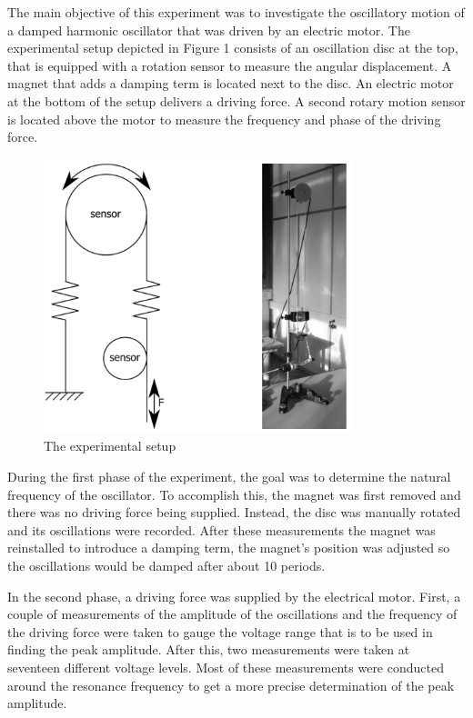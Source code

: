 The main objective of this experiment was to investigate the oscillatory motion of a damped harmonic oscillator that was driven by an electric motor. The experimental setup depicted in Figure 1 consists of an oscillation disc at the top, that is equipped with a rotation sensor to measure the angular displacement. A magnet that adds a damping term is located next to the disc. An electric motor at the bottom of the setup delivers a driving force. A second rotary motion sensor is located above the motor to measure the frequency and phase of the driving force.

\begin{figure}[h!]
    \centering
    \includegraphics[width=0.8\textwidth]{oscillations/images/setup}
    \caption{The experimental setup}
    \label{fig:setup}
\end{figure}

During the first phase of the experiment, the goal was to determine the natural frequency of the oscillator. To accomplish this, the magnet was first removed and there was no driving force being supplied. Instead, the disc was manually rotated and its oscillations were recorded.
After these measurements the magnet was reinstalled to introduce a damping term, the magnet's position was adjusted so the oscillations would be damped after about 10 periods.

In the second phase, a driving force was supplied by the electrical motor. First, a couple of measurements of the amplitude of the oscillations and the frequency of the driving force were taken to gauge the voltage range that is to be used in finding the peak amplitude. After this, two measurements were taken at seventeen different voltage levels. Most of these measurements were conducted around the resonance frequency to get a more precise determination of the peak amplitude.

